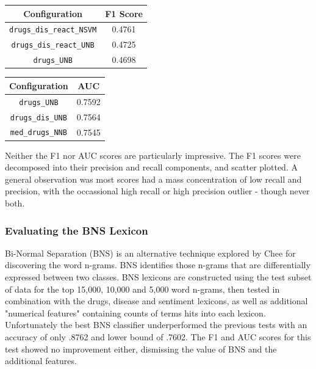 \documentclass[twoside,11pt]{article}
\begin{document}
\begin{center}
  \begin{tabular}{||c c||}
    \hline
    Configuration & F1 Score\\
    \hline\hline
    \verb|drugs_dis_react_NSVM| & 0.4761 \\
    \hline
    \verb|drugs_dis_react_UNB| & 0.4725 \\
    \hline
    \verb|drugs_UNB| & 0.4698 \\
    \hline
  \end{tabular}
  \quad
  \begin{tabular}{||c c||}
    \hline Configuration & AUC \\
    \hline\hline
    \verb|drugs_UNB| & 0.7592 \\
    \hline
    \verb|drugs_dis_UNB| & 0.7564 \\
    \hline
    \verb|med_drugs_NNB| & 0.7545 \\
    \hline
  \end{tabular}
\end{center}
Neither the F1 nor AUC scores are particularly impressive. The F1 scores were decomposed into their precision and recall components, and scatter plotted. A general observation was most scores had a mass concentration of low recall and precision, with the occassional high recall or high precision outlier - though never both.

\subsubsection{Evaluating the BNS Lexicon}
Bi-Normal Separation (BNS) is an alternative technique explored by Chee for discovering the word n-grams. BNS identifies those n-grams that are differentially expressed between two classes. BNS lexicons are constructed using the test subset of data for the top 15,000, 10,000 and 5,000 word n-grams, then tested in combination with the drugs, disease and sentiment lexicons, as well as additional "numerical features" containing counts of terms hits into each lexicon. Unfortunately the best BNS classifier underperformed the previous tests with an accuracy of only .8762 and lower bound of .7602. The F1 and AUC scores for this test showed no improvement either, dismissing the value of BNS and the additional features.
\end{document}
